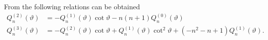 From  the following relations can be obtained
\begin{align}\label{Eq1:expandedLegendreEquationIdentity2}
	Q_n^{(2)}(\vartheta) &= - Q_n^{(1)}(\vartheta)\cot\vartheta -n(n+1)Q_n^{(0)}(\vartheta)\\
	Q_n^{(3)}(\vartheta) &= - Q_n^{(2)}(\vartheta)\cot\vartheta + Q_n^{(1)}(\vartheta)\cot^2\vartheta + (-n^2-n+1)Q_n^{(1)}(\vartheta).\label{Eq1:expandedLegendreEquationIdentity3}
\end{align}

